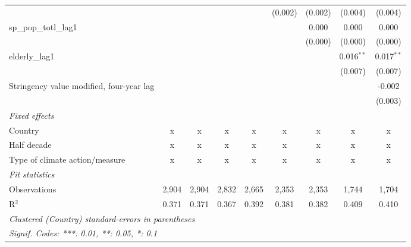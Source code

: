 \begin{tabular}{lcccccccc}
                                                                 &              &              &             &             & (0.002)     & (0.002) & (0.004)      & (0.004)\\   
   sp\_pop\_totl\_lag1                                           &              &              &             &             &             & 0.000   & 0.000        & 0.000\\   
                                                                 &              &              &             &             &             & (0.000) & (0.000)      & (0.000)\\   
   elderly\_lag1                                                 &              &              &             &             &             &         & 0.016$^{**}$ & 0.017$^{**}$\\   
                                                                 &              &              &             &             &             &         & (0.007)      & (0.007)\\   
   Stringency value modified, four-year lag                      &              &              &             &             &             &         &              & -0.002\\   
                                                                 &              &              &             &             &             &         &              & (0.003)\\   
   \emph{Fixed effects}\\
   Country                                                       & x            & x            & x           & x           & x           & x       & x            & x\\  
   Half decade                                                   & x            & x            & x           & x           & x           & x       & x            & x\\  
   Type of climate action/measure                                & x            & x            & x           & x           & x           & x       & x            & x\\  
   \midrule \emph{Fit statistics}\\
   Observations                                                  & 2,904        & 2,904        & 2,832       & 2,665       & 2,353       & 2,353   & 1,744        & 1,704\\  
   R$^2$                                                         & 0.371        & 0.371        & 0.367       & 0.392       & 0.381       & 0.382   & 0.409        & 0.410\\  
   \midrule
   \multicolumn{9}{l}{\emph{Clustered (Country) standard-errors in parentheses}}\\
   \multicolumn{9}{l}{\emph{Signif. Codes: ***: 0.01, **: 0.05, *: 0.1}}\\
\end{tabular}
\par\endgroup


